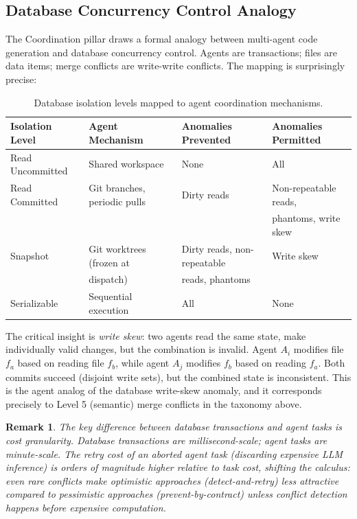 \documentclass[11pt, a4paper, logo, copyright]{googledeepmind}
\newtheorem*{remark}{Remark}
\begin{document}
\subsection{Database Concurrency Control Analogy}

The Coordination pillar draws a formal analogy between multi-agent code generation and database concurrency control. Agents are transactions; files are data items; merge conflicts are write-write conflicts. The mapping is surprisingly precise:

\begin{table}[ht]
\centering
\caption{Database isolation levels mapped to agent coordination mechanisms.}
\label{tab:isolation-levels}
\begin{tabular}{llll}
\toprule
\textbf{Isolation Level} & \textbf{Agent Mechanism} & \textbf{Anomalies Prevented} & \textbf{Anomalies Permitted} \\
\midrule
Read Uncommitted & Shared workspace & None & All \\
Read Committed & Git branches, periodic pulls & Dirty reads & Non-repeatable reads, \\
 & & & phantoms, write skew \\
Snapshot & Git worktrees (frozen at & Dirty reads, non-repeatable & Write skew \\
 & dispatch) & reads, phantoms & \\
Serializable & Sequential execution & All & None \\
\bottomrule
\end{tabular}
\end{table}

The critical insight is \emph{write skew}: two agents read the same state, make individually valid changes, but the combination is invalid. Agent $A_i$ modifies file $f_a$ based on reading file $f_b$, while agent $A_j$ modifies $f_b$ based on reading $f_a$. Both commits succeed (disjoint write sets), but the combined state is inconsistent. This is the agent analog of the database write-skew anomaly, and it corresponds precisely to Level 5 (semantic) merge conflicts in the taxonomy above.

\begin{remark}
The key difference between database transactions and agent tasks is cost granularity. Database transactions are millisecond-scale; agent tasks are minute-scale. The retry cost of an aborted agent task (discarding expensive LLM inference) is orders of magnitude higher relative to task cost, shifting the calculus: even rare conflicts make optimistic approaches (detect-and-retry) less attractive compared to pessimistic approaches (prevent-by-contract) unless conflict detection happens before expensive computation.
\end{remark}
\end{document}
